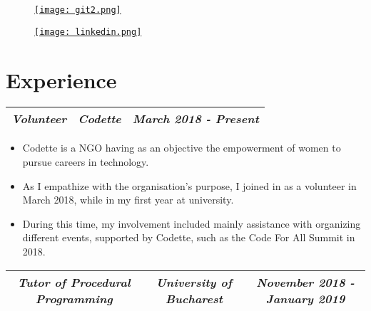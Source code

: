 \documentclass[11px]{article}
\begin{document}
    \begin{figure}[!htb]        
        \begin{minipage}{0.05\textwidth}
            \href{https://www.github.com/BogdanVM} {\texttt{[image: git2.png]} }
        \end{minipage}\hfill

        \begin{minipage}{0.15\textwidth}
            \href{https://www.linkedin.com/in/bogdan-vilculescu/} {
                \texttt{[image: linkedin.png]} 
            }
        \end{minipage}
    \end{figure}
    
    \section*{ Experience }
        \setlength{\tabcolsep}{55pt}
        \begin{tabular} {ccc}
            \small\textit{\textbf{Volunteer}} 
            & \small\textit{\textbf{Codette}} 
            & \small\textit{\textbf{March 2018 - Present}}\\
            \hline
        \end{tabular}

        \begin{itemize}
            \item Codette is a NGO having as an objective the empowerment of women to pursue careers in technology.
            \item As I empathize with the organisation's purpose, I joined in as a volunteer in March 2018, while in my first year at university.
            \item During this time, my involvement included mainly assistance with organizing different events, supported by Codette, such as the Code For All Summit in 2018.
        \end{itemize}

        \setlength{\tabcolsep}{15pt}
        \begin{tabular} {ccc}
            \small\textit{\textbf{Tutor of Procedural Programming}} 
            & \small\textit{\textbf{University of Bucharest}} 
            & \small\textit{\textbf{November 2018 - January 2019}}\\
            \hline
        \end{tabular}
\end{document}
